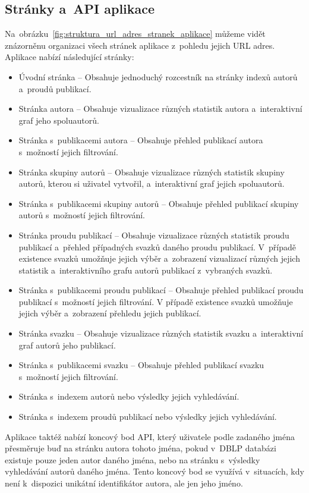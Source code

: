 \documentclass[
  biblatex,
  sourcecodes,
  glossaries,
  index
]{kidiplom}
\begin{document}
\subsection{Stránky a~API aplikace}

Na~obrázku~\ref{fig:struktura_url_adres_stranek_aplikace} můžeme vidět znázorněnu organizaci všech stránek aplikace z~pohledu jejich URL adres. Aplikace nabízí následující stránky:

\begin{itemize}
\item Úvodní stránka -- Obsahuje jednoduchý rozcestník na stránky indexů autorů a~proudů publikací.
\item Stránka autora -- Obsahuje vizualizace různých statistik autora a~interaktivní graf jeho spoluautorů.
\item Stránka s~publikacemi autora -- Obsahuje přehled publikací autora s~možností jejich filtrování.
\item Stránka skupiny autorů -- Obsahuje vizualizace různých statistik skupiny autorů, kterou si uživatel vytvořil, a~interaktivní graf jejich spoluautorů.
\item Stránka s~publikacemi skupiny autorů -- Obsahuje přehled publikací skupiny autorů s~možností jejich filtrování.
\item Stránka proudu publikací -- Obsahuje vizualizace různých statistik proudu publikací a~přehled případných svazků daného proudu publikací. V~případě existence svazků umožňuje jejich výběr a~zobrazení vizualizací různých jejich statistik a~interaktivního grafu autorů publikací z~vybraných svazků.
\item Stránka s~publikacemi proudu publikací -- Obsahuje přehled publikací proudu publikací s~možností jejich filtrování. V případě existence svazků umožňuje jejich výběr a~zobrazení přehledu jejich publikací.
\item Stránka svazku -- Obsahuje vizualizace různých statistik svazku a~interaktivní graf autorů jeho publikací.
\item Stránka s~publikacemi svazku -- Obsahuje přehled publikací svazku s~možností jejich filtrování.
\item Stránka s~indexem autorů nebo výsledky jejich vyhledávání.
\item Stránka s~indexem proudů publikací nebo výsledky jejich vyhledávání.
\end{itemize}

Aplikace taktéž nabízí koncový bod API, který uživatele podle zadaného jména přesměruje buď na stránku autora tohoto jména, pokud v~DBLP databázi existuje pouze jeden autor daného jména, nebo na stránku s~výsledky vyhledávání autorů daného jména. Tento koncový bod se využívá v~situacích, kdy není k~dispozici unikátní identifikátor autora, ale jen jeho jméno.
\end{document}
